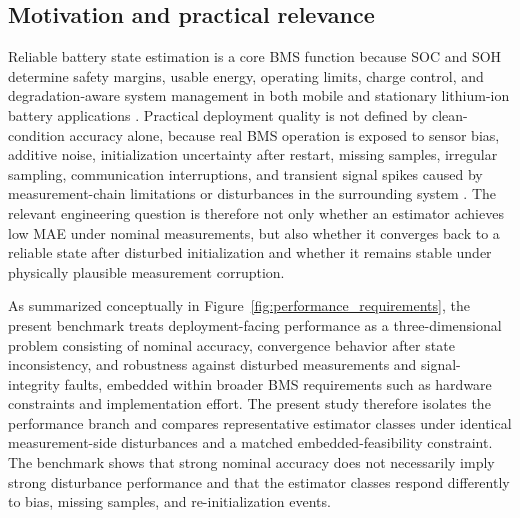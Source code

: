 \documentclass[review]{elsarticle}
\begin{document}
\subsection{Motivation and practical relevance}
Reliable battery state estimation is a core BMS function because SOC and SOH determine safety margins, usable energy, operating limits, charge control, and degradation-aware system management in both mobile and stationary lithium-ion battery applications \cite{shrivastavaReviewTechnologicalAdvancement2023,guoSystematicReviewElectrochemical2024,yaoSmarterBatteryManagement2025b}. Practical deployment quality is not defined by clean-condition accuracy alone, because real BMS operation is exposed to sensor bias, additive noise, initialization uncertainty after restart, missing samples, irregular sampling, communication interruptions, and transient signal spikes caused by measurement-chain limitations or disturbances in the surrounding system \cite{liRobustnessSOCEstimation2015,naseriReliableWirelessBMS2025,bergerBenchmarkingBatteryManagement2024}. The relevant engineering question is therefore not only whether an estimator achieves low MAE under nominal measurements, but also whether it converges back to a reliable state after disturbed initialization and whether it remains stable under physically plausible measurement corruption.

As summarized conceptually in Figure~\ref{fig:performance_requirements}, the present benchmark treats deployment-facing performance as a three-dimensional problem consisting of nominal accuracy, convergence behavior after state inconsistency, and robustness against disturbed measurements and signal-integrity faults, embedded within broader BMS requirements such as hardware constraints and implementation effort. The present study therefore isolates the performance branch and compares representative estimator classes under identical measurement-side disturbances and a matched embedded-feasibility constraint. The benchmark shows that strong nominal accuracy does not necessarily imply strong disturbance performance and that the estimator classes respond differently to bias, missing samples, and re-initialization events.
\end{document}
